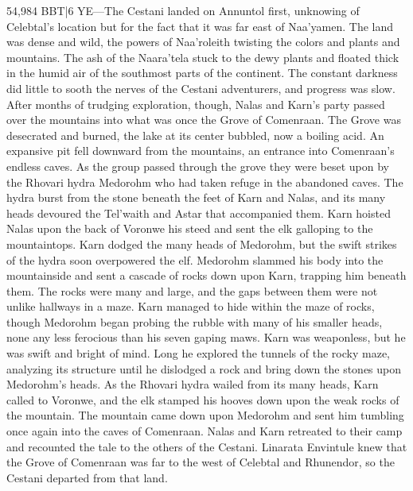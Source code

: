 \documentclass[smalldemyvopaper,11pt,twoside,onecolumn,openright,extrafontsizes]{memoir}
\begin{document}
54,984 BBT|6 YE—The Cestani landed on Annuntol first, unknowing of Celebtal’s location but for the fact that it was far east of Naa’yamen. The land was dense and wild, the powers of Naa’roleith twisting the colors and plants and mountains. The ash of the Naara’tela stuck to the dewy plants and floated thick in the humid air of the southmost parts of the continent. The constant darkness did little to sooth the nerves of the Cestani adventurers, and progress was slow. After months of trudging exploration, though, Nalas and Karn’s party passed over the mountains into what was once the Grove of Comenraan. The Grove was desecrated and burned, the lake at its center bubbled, now a boiling acid. An expansive pit fell downward from the mountains, an entrance into Comenraan’s endless caves. As the group passed through the grove they were beset upon by the Rhovari hydra Medorohm who had taken refuge in the abandoned caves. The hydra burst from the stone beneath the feet of Karn and Nalas, and its many heads devoured the Tel’waith and Astar that accompanied them. Karn hoisted Nalas upon the back of Voronwe his steed and sent the elk galloping to the mountaintops.
	Karn dodged the many heads of Medorohm, but the swift strikes of the hydra soon overpowered the elf. Medorohm slammed his body into the mountainside and sent a cascade of rocks down upon Karn, trapping him beneath them. The rocks were many and large, and the gaps between them were not unlike hallways in a maze. Karn managed to hide within the maze of rocks, though Medorohm began probing the rubble with many of his smaller heads, none any less ferocious than his seven gaping maws. Karn was weaponless, but he was swift and bright of mind. Long he explored the tunnels of the rocky maze, analyzing its structure until he dislodged a rock and bring down the stones upon Medorohm’s heads. As the Rhovari hydra wailed from its many heads, Karn called to Voronwe, and the elk stamped his hooves down upon the weak rocks of the mountain. The mountain came down upon Medorohm and sent him tumbling once again into the caves of Comenraan.
	Nalas and Karn retreated to their camp and recounted the tale to the others of the Cestani. Linarata Envintule knew that the Grove of Comenraan was far to the west of Celebtal and Rhunendor, so the Cestani departed from that land.
\end{document}
